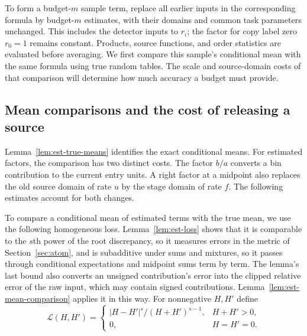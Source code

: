 To form a budget-$m$ sample term, replace all earlier inputs in the
corresponding formula by budget-$m$ estimates, with their domains and
common task parameters unchanged.  This includes the detector inputs
to $r_i$; the factor for copy label zero $r_0=1$ remains constant.  Products, source
functions, and order statistics are evaluated before averaging.  We first compare
this sample's conditional mean with the same formula using true random tables.
The scale and source-domain costs of that comparison will determine
how much accuracy a budget must provide.

\subsection{Mean comparisons and the cost of releasing a source}

Lemma~\ref{lem:est-true-means} identifies the exact conditional means.
For estimated factors, the comparison has two distinct costs.  The
factor $b/a$ converts a bin contribution to the current entry units.
A right factor at a midpoint also replaces the old source domain of
rate $u$ by the stage domain of rate $f$.  The following estimates
account for both changes.

To compare a conditional mean of estimated terms with the true mean, we use the following homogeneous loss.
Lemma~\ref{lem:est-loss} shows that it is comparable to the $s$th power
of the root discrepancy, so it measures errors in the metric of
Section~\ref{sec:atom}, and is subadditive under sums and mixtures, so
it passes through conditional expectations and midpoint sums term by term.
The lemma's last bound also converts an unsigned contribution's error
into the clipped relative error of the raw input, which may contain
signed contributions.  Lemma~\ref{lem:est-mean-comparison} applies it
in this way.  For nonnegative $H,H'$ define
\begin{equation}
 \mathcal L(H,H')=
 \begin{cases}|H-H'|^s/(H+H')^{s-1},&H+H'>0,\\0,&H=H'=0.
 \end{cases}
 \label{eq:est-loss}
\end{equation}

